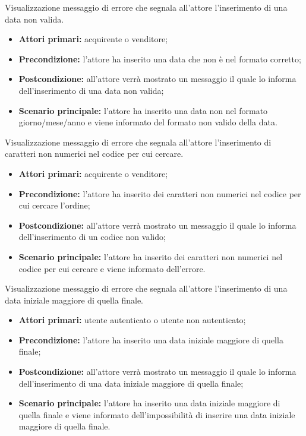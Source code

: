 Visualizzazione messaggio di errore che segnala all'attore l'inserimento di una data non valida.
\begin{itemize}
    \item \textbf{Attori primari:} acquirente o venditore;
    \item \textbf{Precondizione:} l'attore ha inserito una data che non è nel formato corretto;
    \item \textbf{Postcondizione:} all'attore verrà mostrato un messaggio il quale lo informa dell'inserimento di una data non valida;
    \item \textbf{Scenario principale:} l'attore ha inserito una data non nel formato giorno/mese/anno e viene informato del formato non valido della data.
\end{itemize}

Visualizzazione messaggio di errore che segnala all'attore l'inserimento di caratteri non numerici nel codice per cui cercare.
\begin{itemize}
    \item \textbf{Attori primari:} acquirente o venditore;
    \item \textbf{Precondizione:} l'attore ha inserito dei caratteri non numerici nel codice per cui cercare l'ordine;
    \item \textbf{Postcondizione:} all'attore verrà mostrato un messaggio il quale lo informa dell'inserimento di un codice non valido;
    \item \textbf{Scenario principale:} l'attore ha inserito dei caratteri non numerici nel codice per cui cercare e viene informato dell'errore.
\end{itemize}

Visualizzazione messaggio di errore che segnala all'attore l'inserimento di una data iniziale maggiore di quella finale.
\begin{itemize}
    \item \textbf{Attori primari:} utente autenticato o utente non autenticato;
    \item \textbf{Precondizione:} l'attore ha inserito una data iniziale maggiore di quella finale;
    \item \textbf{Postcondizione:} all'attore verrà mostrato un messaggio il quale lo informa dell'inserimento di una data iniziale maggiore di quella finale;
    \item \textbf{Scenario principale:} l'attore ha inserito una data iniziale maggiore di quella finale e viene informato dell'impossibilità di inserire una data iniziale maggiore di quella finale.
\end{itemize}

